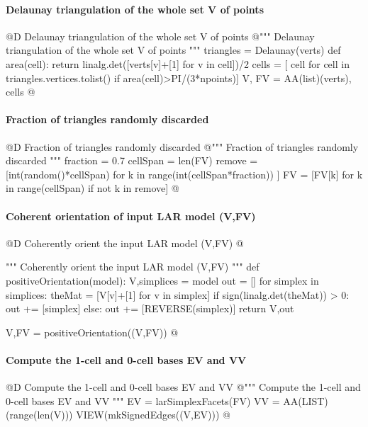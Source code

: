 \documentclass[11pt,oneside]{article}	%
\begin{document}
\paragraph{Delaunay triangulation of the whole set V of points}
@D Delaunay triangulation of the whole set V of points
@{""" Delaunay triangulation of the whole set V of points """
triangles = Delaunay(verts)
def area(cell): return linalg.det([verts[v]+[1] for v in cell])/2
cells = [ cell for cell in triangles.vertices.tolist() if area(cell)>PI/(3*npoints)]
V, FV = AA(list)(verts), cells
@}

\paragraph{Fraction of triangles randomly discarded}
@D Fraction of triangles randomly discarded
@{""" Fraction of triangles randomly discarded """
fraction = 0.7
cellSpan = len(FV)
remove = [int(random()*cellSpan) for k in range(int(cellSpan*fraction)) ]
FV = [FV[k] for k in range(cellSpan) if not k in remove]
@}

\paragraph{Coherent orientation of input LAR model (V,FV)}
@D Coherently orient the input LAR model (V,FV)
@{""" Coherently orient the input LAR model (V,FV) """
def positiveOrientation(model):
	V,simplices = model
	out = []
	for simplex in simplices:
		theMat = [V[v]+[1] for v in simplex]
		if sign(linalg.det(theMat)) > 0:  out += [simplex]
		else: out += [REVERSE(simplex)]
	return V,out

V,FV = positiveOrientation((V,FV))
@}

\paragraph{Compute the 1-cell and 0-cell bases EV and VV}
@D Compute the 1-cell and 0-cell bases EV and VV
@{""" Compute the 1-cell and 0-cell bases EV and VV """
EV = larSimplexFacets(FV)
VV = AA(LIST)(range(len(V)))
VIEW(mkSignedEdges((V,EV)))
@}
\end{document}
